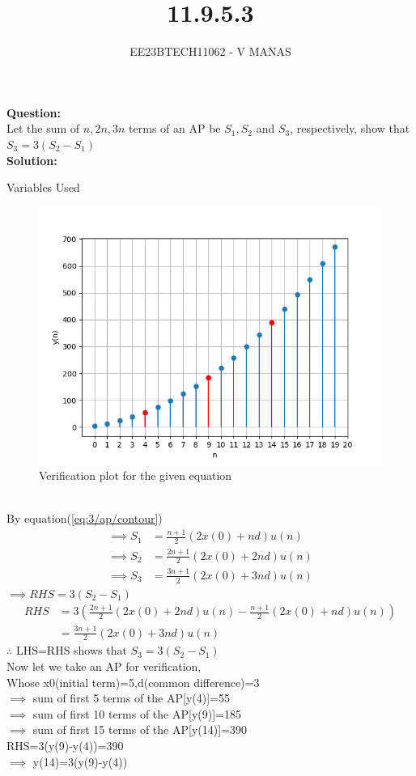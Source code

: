 \documentclass[journal,12pt,twocolumn]{IEEEtran}
\theoremstyle{remark}
\begin{document}

\vspace{3cm}

\title{11.9.5.3}
\author{EE23BTECH11062 - V MANAS}
\maketitle
\newpage

\bigskip
\textbf{Question:}\\Let the sum of $n,2n,3n$ terms of an AP be $S_1,S_2$ and $S_3$, respectively, show that $S_3=3(S_2-S_1)$\\
\textbf{Solution:}
\begin{table}[h]
    \centering
    
    \caption{Variables Used}
    \label{tab:table_11.9.5.3}
\end{table}
\begin{figure}[h]
    \centering
    \includegraphics[width=1.1\linewidth]{figs/graph.png}
    \caption{Verification plot for the given equation}
\end{figure}\\
By equation(\ref{eq:3/ap/contour})
\begin{align}
    \implies S_1&=\frac{n+1}{2}(2x(0)+nd)u(n)\\
    \implies S_2&=\frac{2n+1}{2}(2x(0)+2nd)u(n)\\
    \implies S_3&=\frac{3n+1}{2}(2x(0)+3nd)u(n)
\end{align}
$\implies RHS=3(S_2-S_1)$
\begin{align}
    RHS&=3(\frac{2n+1}{2}(2x(0)+2nd)u(n)-\frac{n+1}{2}(2x(0)+nd)u(n))\\
    &=\frac{3n+1}{2}(2x(0)+3nd)u(n)
\end{align}
$\therefore$ LHS=RHS shows that $S_3=3(S_2-S_1)$\\
Now let we take an AP for verification,\\
Whose x0(initial term)=5,d(common difference)=3\\
$\implies$ sum of first 5 terms of the AP[y(4)]=55\\
$\implies$ sum of first 10 terms of the AP[y(9)]=185\\
$\implies$ sum of first 15 terms of the AP[y(14)]=390\\
RHS=3(y(9)-y(4))=390\\
$\implies$ y(14)=3(y(9)-y(4))\\
\end{document}
